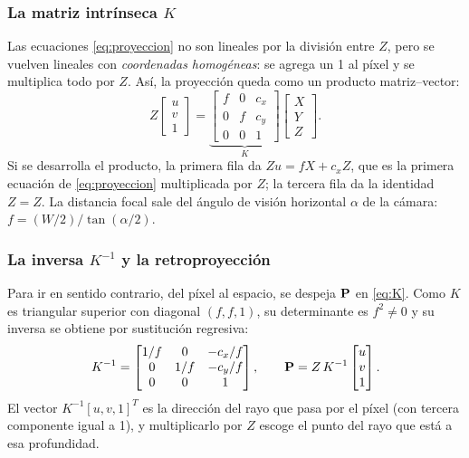 \subsubsection{La matriz intrínseca \texorpdfstring{$K$}{K}}

Las ecuaciones \eqref{eq:proyeccion} no son lineales por la división entre
$Z$, pero se vuelven lineales con \emph{coordenadas homogéneas}: se agrega un
1 al píxel y se multiplica todo por $Z$. Así, la proyección queda como un
producto matriz--vector:
\begin{equation}
Z\begin{bmatrix} u\\ v\\ 1 \end{bmatrix}
= \underbrace{\begin{bmatrix} f & 0 & c_x\\ 0 & f & c_y\\ 0 & 0 & 1 \end{bmatrix}}_{K}
\begin{bmatrix} X\\ Y\\ Z \end{bmatrix}.
\label{eq:K}
\end{equation}
Si se desarrolla el producto, la primera fila da $Zu=fX+c_xZ$, que es la
primera ecuación de \eqref{eq:proyeccion} multiplicada por $Z$; la tercera
fila da la identidad $Z=Z$. La distancia focal sale del ángulo de visión
horizontal $\alpha$ de la cámara: $f=(W/2)/\tan(\alpha/2)$.

\subsubsection{La inversa \texorpdfstring{$K^{-1}$}{K inversa} y la retroproyección}

Para ir en sentido contrario, del píxel al espacio, se despeja $\mathbf{P}$ en
\eqref{eq:K}. Como $K$ es triangular superior con diagonal $(f,f,1)$, su
determinante es $f^2\neq0$ y su inversa se obtiene por sustitución regresiva:
\begin{equation}
K^{-1} = \begin{bmatrix} 1/f & 0 & -c_x/f\\ 0 & 1/f & -c_y/f\\ 0 & 0 & 1 \end{bmatrix},
\qquad
\mathbf{P} = Z\,K^{-1}\begin{bmatrix} u\\ v\\ 1 \end{bmatrix}.
\label{eq:retro}
\end{equation}
El vector $K^{-1}[u,v,1]^{T}$ es la dirección del rayo que pasa por el píxel
(con tercera componente igual a 1), y multiplicarlo por $Z$ escoge el punto
del rayo que está a esa profundidad.

